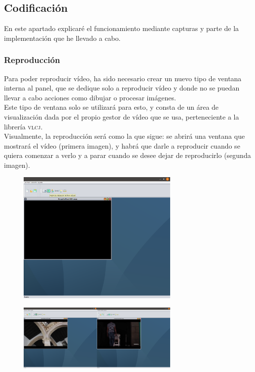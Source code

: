 \documentclass[11pt,a4paper]{article}
\begin{document}
\subsection{Codificación}
En este apartado explicaré el funcionamiento mediante capturas y parte de la implementación que he llevado a cabo.

\subsubsection{Reproducción}
Para poder reproducir vídeo, ha sido necesario crear un nuevo tipo de ventana interna al panel, que se dedique solo a reproducir vídeo y donde no se puedan llevar a cabo acciones como dibujar o procesar imágenes.\\

Este tipo de ventana solo se utilizará para esto, y consta de un área de visualización dada por el propio gestor de vídeo que se usa, perteneciente a la librería \textsc{vlcj}.\\

Visualmente, la reproducción será como la que sigue: se abrirá una ventana que mostrará el vídeo (primera imagen), y habrá que darle a reproducir cuando se quiera comenzar a verlo y a parar cuando se desee dejar de reproducirlo (segunda imagen).

\begin{figure}[H]
\centering
	\includegraphics[width=0.7\textwidth]{img/initvid.png}
\end{figure}

\begin{figure}[H]
\centering
	\includegraphics[width=0.7\textwidth]{img/video.png}
\end{figure}
\end{document}
